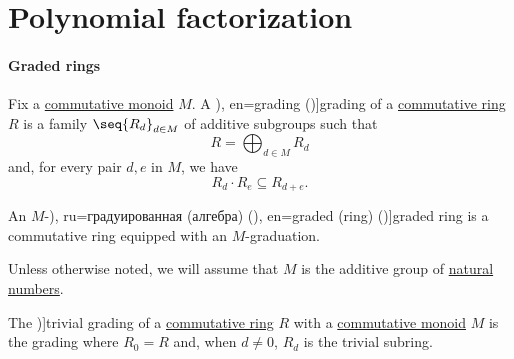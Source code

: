 \section{Polynomial factorization}\label{sec:polynomial_factorization}

\paragraph{Graded rings}

\begin{definition}\label{def:graded_ring}
  Fix a \hyperref[def:monoid/commutative]{commutative monoid} \( M \). A \term[ru=градуировка (\cite[197]{Винберг2014Алгебра}), en=grading (\cite[527]{Aluffi2009Algebra})]{grading} of a \hyperref[def:ring/commutative]{commutative ring} \( R \) is a family \( \seq{ R_d }_{d \in M} \) of additive subgroups such that
  \begin{equation*}
    R = \bigoplus_{d \in M} R_d
  \end{equation*}
  and, for every pair \( d, e \) in \( M \), we have
  \begin{equation}\label{eq:def:graded_ring}
    R_d \cdot R_e \subseteq R_{d + e}.
  \end{equation}

  An \( M \)-\term[bg=градуиран (пръстен) (\cite[56]{КоцевСидеров2016КомАлгебра}), ru=градуированная (алгебра) (\cite[197]{Винберг2014Алгебра}), en=graded (ring) (\cite[29]{Eisenbud1995CommAlgebra})]{graded ring} is a commutative ring equipped with an \( M \)-graduation.

  Unless otherwise noted, we will assume that \( M \) is the additive group of \hyperref[def:natural_numbers]{natural numbers}.
\end{definition}

\begin{definition}\label{def:trivial_ring_grading}
  The \term[en=trivial (graduation) (\cite[457]{Bourbaki1998Algebra1to3})]{trivial grading} of a \hyperref[def:ring/commutative]{commutative ring} \( R \) with a \hyperref[def:monoid/commutative]{commutative monoid} \( M \) is the grading where \( R_0 = R \) and, when \( d \neq 0 \), \( R_d \) is the trivial subring.
\end{definition}

